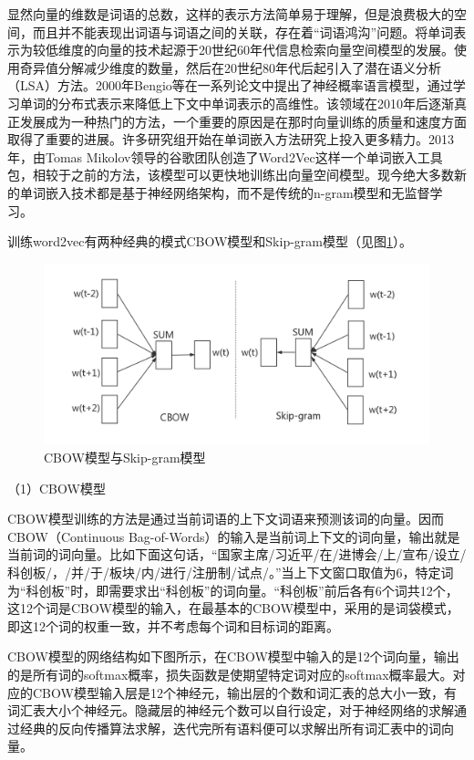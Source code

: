\documentclass[winfonts,master,oneside,nobackinfo]{njuthesis}
\begin{document}
显然向量的维数是词语的总数，这样的表示方法简单易于理解，但是浪费极大的空间，而且并不能表现出词语与词语之间的关联，存在着“词语鸿沟”问题。将单词表示为较低维度的向量的技术起源于20世纪60年代信息检索向量空间模型的发展。使用奇异值分解减少维度的数量，然后在20世纪80年代后起引入了潜在语义分析（LSA）方法。2000年Bengio等\cite{Bengio}在一系列论文中提出了神经概率语言模型，通过学习单词的分布式表示来降低上下文中单词表示的高维性。该领域在2010年后逐渐真正发展成为一种热门的方法，一个重要的原因是在那时向量训练的质量和速度方面取得了重要的进展。许多研究组开始在单词嵌入方法研究上投入更多精力。2013年，由Tomas Mikolov领导的谷歌团队创造了Word2Vec这样一个单词嵌入工具包\cite{word2vec}，相较于之前的方法，该模型可以更快地训练出向量空间模型。现今绝大多数新的单词嵌入技术都是基于神经网络架构，而不是传统的n-gram模型和无监督学习。

训练word2vec有两种经典的模式CBOW模型和Skip-gram模型（见图\ref{cbow-skip}）。

\begin{figure}[h]
\centering
\includegraphics[width=	1\textwidth]{./figure/CBOW模型.jpg}
\caption{CBOW模型与Skip-gram模型}
\label{cbow-skip}
\end{figure}

（1）CBOW模型

CBOW模型训练的方法是通过当前词语的上下文词语来预测该词的向量。因而CBOW（Continuous Bag-of-Words）的输入是当前词上下文的词向量，输出就是当前词的词向量。比如下面这句话，“国家主席/习近平/在/进博会/上/宣布/设立/科创板/，/并/于/板块/内/进行/注册制/试点/。”当上下文窗口取值为6，特定词为“科创板”时，即需要求出“科创板”的词向量。“科创板”前后各有6个词共12个，这12个词是CBOW模型的输入，在最基本的CBOW模型中，采用的是词袋模式，即这12个词的权重一致，并不考虑每个词和目标词的距离。

CBOW模型的网络结构如下图所示，在CBOW模型中输入的是12个词向量，输出的是所有词的softmax概率，损失函数是使期望特定词对应的softmax概率最大。对应的CBOW模型输入层是12个神经元，输出层的个数和词汇表的总大小一致，有词汇表大小个神经元。隐藏层的神经元个数可以自行设定，对于神经网络的求解通过经典的反向传播算法求解，迭代完所有语料便可以求解出所有词汇表中的词向量。
\end{document}
